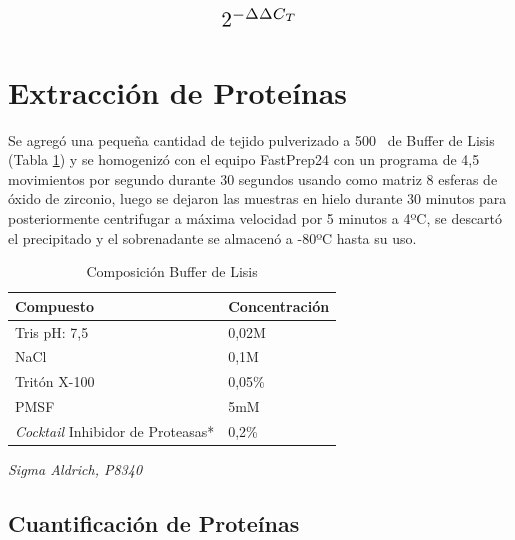 \documentclass[12pt,letterpaper,oneside]{scrbook}
\begin{document}
\begin{displaymath}
\scalebox{1.5}{
$2^{-\Delta\Delta C_T}$
}
\end{displaymath}

\clearpage

\section{Extracción de Proteínas}

Se agregó una pequeña cantidad de tejido pulverizado a
500\si{\micro\litro} de Buffer de Lisis (Tabla \ref{tablabufferlisis}) y
se homogenizó con el equipo FastPrep24 con un programa de 4,5
movimientos por segundo durante 30 segundos usando como matriz 8 esferas
de óxido de zirconio, luego se dejaron las muestras en hielo durante 30
minutos para posteriormente centrifugar a máxima velocidad por 5 minutos
a 4ºC, se descartó el precipitado y el sobrenadante se almacenó a -80ºC
hasta su uso.

\begin{table}[h!]
    \begin{center}
        \begin{threeparttable}
            \caption{Composición Buffer de Lisis}\label{tablabufferlisis}
            \begin{tabularx}{10cm}{X l}
                \toprule
                Compuesto & Concentración \\
                \midrule
                Tris pH: 7,5 & 0,02M \\
                NaCl & 0,1M \\
                Tritón X-100 & 0,05\% \\
                PMSF & 5mM \\
                \emph{Cocktail} Inhibidor de Proteasas* & 0,2\% \\
                \bottomrule
            \end{tabularx}
            \begin{tablenotes}
                \item *\emph{Sigma Aldrich, P8340}
            \end{tablenotes}
        \end{threeparttable}
    \end{center}
\end{table}

\subsection{Cuantificación de Proteínas}
\label{cuantificacionbca}
\end{document}
